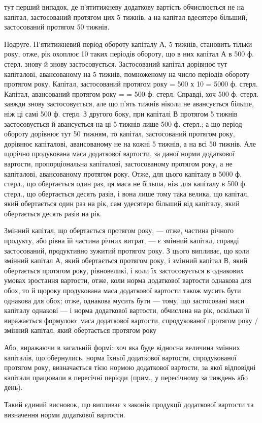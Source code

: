 \parcont{}  %
тут перший випадок, де п’ятитижневу додаткову вартість обчислюється
не на капітал, застосований протягом цих 5 тижнів, а на капітал вдесятеро
більший, застосований протягом 50 тижнів.

Подруге. П’ятитижневий період обороту капіталу А, 5 тижнів,
становить тільки  року, отже, рік охоплює 10 таких періодів обороту,
що в них капітал А в 500 ф. стерл. знову й знову застосовується.
Застосований капітал дорівнює тут капіталові, авансованому на 5 тижнів,
помноженому на число періодів обороту протягом року. Капітал, застосований
протягом року = 500 х 10 = 5000 ф. стерл. Капітал, авансований
протягом року =  = 500 ф. стерл. Справді, хоч 500 ф. стерл. завжди
знову застосовується, але що п’ять тижнів ніколи не авансується більше,
ніж ці самі 500 ф. стерл. З другого боку, при капіталі В протягом 5 тижнів
застосовується й авансується на ці 5 тижнів лише 500 ф. стерл.; а що
період обороту дорівнює тут 50 тижням, то капітал, застосований протягом
року, дорівнює капіталові, авансованому не на кожні 5 тижнів, а на
всі 50 тижнів. Але щорічно продукована маса додаткової вартости, за
даної норми додаткової вартости, пропорціональна капіталові, застосованому
протягом року, а не капіталові, авансованому протягом року. Отже, для
цього капіталу в 5000 ф. стерл., що обертається один раз, ця маса не
більша, ніж для капіталу в 500 ф. стерл., що обертається десять разів, і
вона лише тому така велика, що капітал, який обертається один раз на
рік, сам удесятеро більший від капіталу, який обертається десять разів
на рік.

Змінний капітал, що обертається протягом року, — отже, частина річного
продукту, або рівна їй частина річних витрат, — є змінний капітал,
справді застосований, продуктивно зужитий протягом року. З цього випливає,
що коли змінний капітал А, який обертається протягом року, і
змінний капітал В, який обертається протягом року, рівновеликі, і коли
їх застосовується в однакових умовах зростання вартости, отже, коли норма
додаткової вартости однакова для обох, то й щороку продукована
маса додаткової вартости також мусить бути однакова для обох; отже,
однакова мусить бути — тому, що застосовані маси капіталу однакові — і
норма додаткової вартости, обчислена на рік, оскільки її виражається
формулою:
маса додаткової вартости, спродукованої протягом року / змінний капітал, який обертається протягом
року

Або, виражаючи в загальній формі: хоч яка буде відносна величина
змінних капіталів, що обернулись, норма їхньої додаткової вартости,
спродукованої протягом року, визначається тією нормою додаткової вартости,
за якої відповідні капітали працювали в пересічні періоди (прим.,
у пересічному за тиждень або день).

Такий єдиний висновок, що випливає з законів продукції додаткової
вартости та визначення норми додаткової вартости.
